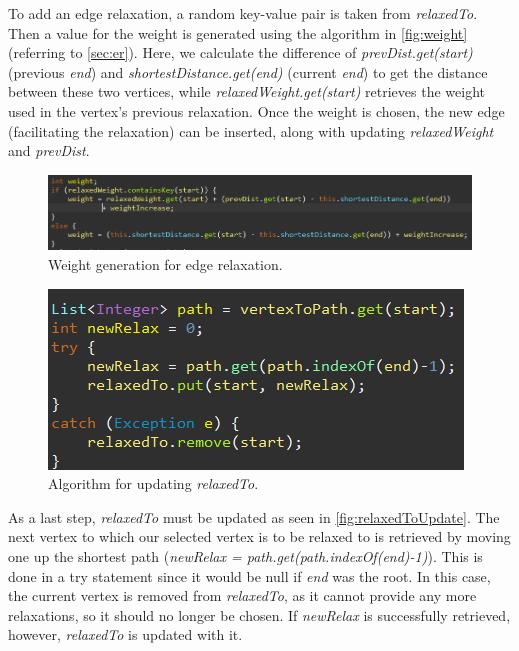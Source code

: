 \documentclass{l4proj}
\begin{document}
To add an edge relaxation, a random key-value pair is taken from \emph{relaxedTo}. Then a value for the weight is generated using the algorithm in \autoref{fig:weight} (referring to \autoref{sec:er}). Here, we calculate the difference of \emph{prevDist.get(start)} (previous \emph{end}) and \emph{shortestDistance.get(end)} (current \emph{end}) to get the distance between these two vertices, while \emph{relaxedWeight.get(start)} retrieves the weight used in the vertex's previous relaxation. Once the weight is chosen, the new edge (facilitating the relaxation) can be inserted, along with updating \emph{relaxedWeight} and \emph{prevDist}.

\begin{figure}
    \centering
    \includegraphics[width=0.99\linewidth]{images/weight.png}    

    \caption{Weight generation for edge relaxation.}
    \label{fig:weight} 
\end{figure}

\begin{figure}
    \centering
    \includegraphics[width=0.5\linewidth]{images/relaxedToUpdate.png}    

    \caption{Algorithm for updating \emph{relaxedTo}.}
    \label{fig:relaxedToUpdate} 
\end{figure}

As a last step, \emph{relaxedTo} must be updated as seen in \autoref{fig:relaxedToUpdate}. The next vertex to which our selected vertex is to be relaxed to is retrieved by moving one up the shortest path (\emph{newRelax = path.get(path.indexOf(end)-1)}). This is done in a try statement since it would be null if \emph{end} was the root. In this case, the current vertex is removed from \emph{relaxedTo}, as it cannot provide any more relaxations, so it should no longer be chosen. If \emph{newRelax} is successfully retrieved, however, \emph{relaxedTo} is updated with it.
\end{document}
